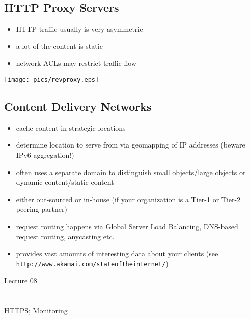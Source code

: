 \documentclass[xga]{xdvislides}
\begin{document}
\subsection{HTTP Proxy Servers}
\begin{itemize}
	\item HTTP traffic usually is very asymmetric
	\item a lot of the content is static
	\item network ACLs may restrict traffic flow
\end{itemize}
\vspace{.25in}
\begin{center}
	\texttt{[image: pics/revproxy.eps]}
\end{center}

\subsection{Content Delivery Networks}
\begin{itemize}
	\item cache content in strategic locations
	\item determine location to serve from via geomapping of IP
		addresses (beware IPv6 aggregation!)
	\item often uses a separate domain to distinguish small
		objects/large objects or dynamic content/static content
	\item either out-sourced or in-house (if your organization is a
		Tier-1 or Tier-2 peering partner)
	\item request routing happens via Global Server Load Balancing,
		DNS-based request routing, anycasting etc.
	\item provides vast amounts of interesting data about your clients
		(see \verb+http://www.akamai.com/stateoftheinternet/+)
\end{itemize}

\newpage
\vspace*{\fill}
\begin{center}
    \Hugesize
        Lecture 08 \\ [1em]
    \hspace*{5mm}
    \blueline\\
    \hspace*{5mm}\\
	HTTPS; Monitoring
\end{center}
\vspace*{\fill}
\end{document}
